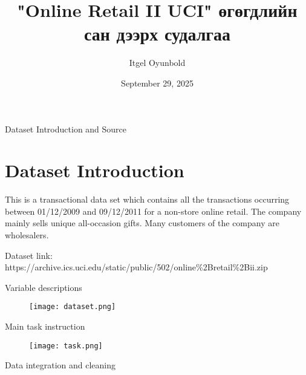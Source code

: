 \documentclass{beamer}
\title{"Online Retail II UCI" өгөгдлийн сан дээрх судалгаа}
\author{Itgel Oyunbold}
\institute{MCS сонгон шалгаруулалтын даалгавар}
\date{September 29, 2025}
\begin{document}
\begin{frame}
  \titlepage
\end{frame}

\begin{frame}{Dataset Introduction and Source}

\section*{Dataset Introduction}
This is a transactional data set which contains all the transactions occurring between
01/12/2009 and 09/12/2011 for a non-store online retail. The company mainly sells unique all-occasion gifts. Many customers of the company are wholesalers.

\vspace{1cm}

Dataset link: https://archive.ics.uci.edu/static/public/502/online\%2Bretail\%2Bii.zip

    
\end{frame}

\begin{frame}{Variable descriptions}
\begin{figure}
        \centering
        \texttt{[image: dataset.png]}
      \end{figure}
\end{frame}


\begin{frame}{Main task instruction}
    \begin{figure}
        \centering
        \texttt{[image: task.png]}
      \end{figure}
\end{frame}

\begin{frame}{Data integration and cleaning}

\end{frame}
\end{document}

